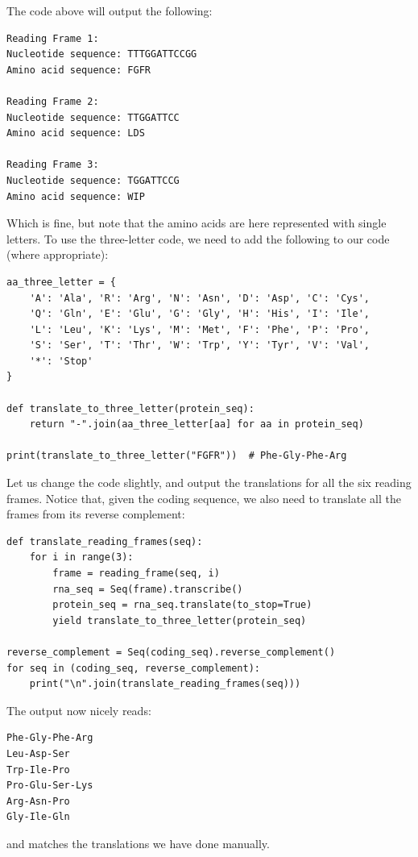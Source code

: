 The code above will output the following:

\vspace*{3mm}
\begin{lstlisting}
Reading Frame 1:
Nucleotide sequence: TTTGGATTCCGG
Amino acid sequence: FGFR

Reading Frame 2:
Nucleotide sequence: TTGGATTCC
Amino acid sequence: LDS

Reading Frame 3:
Nucleotide sequence: TGGATTCCG
Amino acid sequence: WIP
\end{lstlisting}

Which is fine, but note that the amino acids are here represented with single letters. To use the three-letter code, we need to add the following to our code (where appropriate):

\vspace*{3mm}
\begin{lstlisting}
aa_three_letter = {
    'A': 'Ala', 'R': 'Arg', 'N': 'Asn', 'D': 'Asp', 'C': 'Cys',
    'Q': 'Gln', 'E': 'Glu', 'G': 'Gly', 'H': 'His', 'I': 'Ile',
    'L': 'Leu', 'K': 'Lys', 'M': 'Met', 'F': 'Phe', 'P': 'Pro',
    'S': 'Ser', 'T': 'Thr', 'W': 'Trp', 'Y': 'Tyr', 'V': 'Val',
    '*': 'Stop'
}

def translate_to_three_letter(protein_seq):
    return "-".join(aa_three_letter[aa] for aa in protein_seq)

print(translate_to_three_letter("FGFR"))  # Phe-Gly-Phe-Arg
\end{lstlisting}

Let us change the code slightly, and output the translations for all the six reading frames. Notice that, given the coding sequence, we also need to translate all the frames from its reverse complement:

\vspace*{3mm}
\begin{lstlisting}
def translate_reading_frames(seq):
    for i in range(3):
        frame = reading_frame(seq, i)
        rna_seq = Seq(frame).transcribe()
        protein_seq = rna_seq.translate(to_stop=True)
        yield translate_to_three_letter(protein_seq)

reverse_complement = Seq(coding_seq).reverse_complement()
for seq in (coding_seq, reverse_complement):
    print("\n".join(translate_reading_frames(seq)))
\end{lstlisting}

The output now nicely reads:

\vspace*{3mm}
\begin{lstlisting}
Phe-Gly-Phe-Arg
Leu-Asp-Ser
Trp-Ile-Pro
Pro-Glu-Ser-Lys
Arg-Asn-Pro
Gly-Ile-Gln
\end{lstlisting}
%
and matches the translations we have done manually.

